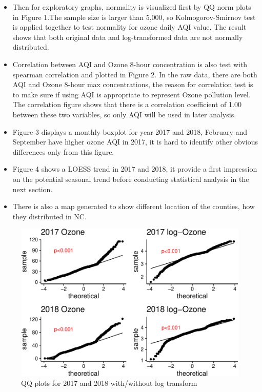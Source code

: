 \documentclass[12pt,]{article}
\begin{document}
\begin{itemize}
\item[]   Then for exploratory graphs, normality is visualized first by QQ norm plots in Figure 1.The sample size is larger than 5,000, so Kolmogorov-Smirnov test is applied together to test normality for ozone daily AQI value. The result shows that both original data and log-transformed data are not normally distributed. \
\item[] Correlation between AQI and Ozone 8-hour concentration is also test with spearman correlation and plotted in Figure 2. In the raw data, there are both AQI and Ozone 8-hour max concentrations, the reason for correlation test is to make sure if using AQI is appropriate to represent Ozone pollution level. The correlation figure shows that there is a correlation coefficient of 1.00 between these two variables, so only AQI will be used in later analysis.   \item[] Figure 3 displays a monthly boxplot for year 2017 and 2018, February and September have higher ozone AQI in 2017, it is hard to identify other obvious differences only from this figure. \
\item[] Figure 4 shows a LOESS trend in 2017 and 2018, it provide a first impression on the potential seasonal trend before conducting statistical analysis in the next section. \
\item[] There is also a map generated to show different location of the counties, how they distributed in NC.
\end{itemize}

\begin{figure}
\centering
\includegraphics{Xia_ENV_872_Project_files/figure-latex/exploration 1-1.pdf}
\caption{QQ plots for 2017 and 2018 with/without log transform}
\end{figure}
\end{document}
